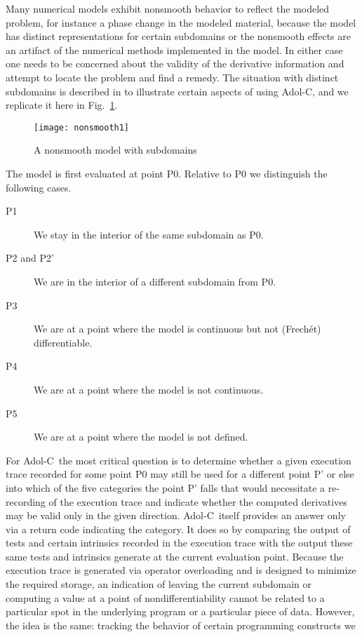 \documentclass{article}
\newcommand{\adolc}{\mbox{Adol-C}}
\newcommand{\reffig}[1]{{Fig.~\ref{#1}}}
\begin{document}
Many numerical models exhibit nonsmooth behavior to reflect the modeled problem, 
for instance a phase change in the modeled material, because the 
model has distinct representations for certain subdomains or the nonsmooth effects 
are an artifact of the numerical methods implemented in the model.
In either case one needs to be concerned about the validity of the 
derivative information and attempt to locate the problem and  find a remedy.  
The situation with distinct subdomains is described in \cite{adolc} to illustrate 
certain aspects of using \adolc, and  we 
replicate it here in \reffig{fig:subdomains}. 
\begin{figure}
\centerline{\texttt{[image: nonsmooth1]}}
\caption{A nonsmooth model with subdomains}\label{fig:subdomains} 
\end{figure}
The model is first evaluated at point P0.  Relative to P0 we distinguish the 
following cases.
\begin{description}
\item[P1] We stay in the interior of the same subdomain as P0.
\item[P2 and P2'] We are in the interior of a different subdomain from P0.
\item[P3] We are at a point where the model is continuous but not (Frech\'et) differentiable.
\item[P4] We are at a point where the model is not continuous.
\item[P5] We are at a point where the model is not defined.
\end{description}    
For \adolc\  the most critical question is to determine whether a given execution trace 
recorded for some point P0 may still be used for a different point P' or else 
into which of the five categories  the point P' falls that would necessitate 
a re-recording of the execution trace and indicate whether the computed derivatives 
may be valid only in the given direction. \adolc\  itself provides an answer only 
via a return code indicating the category. 
It does so by comparing the output of tests and certain intrinsics 
recorded in the execution trace with the output these same tests and intrinsics 
generate at the current evaluation point. 
Because the execution trace is generated via operator overloading and is designed to 
minimize the required storage, an indication of leaving the current subdomain or computing 
a value at a point of nondifferentiability cannot be related to a particular spot in 
the underlying program or a particular piece of data. 
However, the idea is the same: tracking the behavior of certain programming constructs we 
\end{document}
